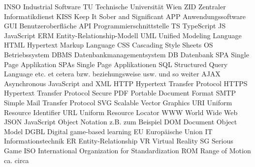 	{INSO}	{Industrial Software}
	{TU}	{Technische Universit\"at Wien}
	{ZID}	{Zentraler Informatikdienst}
	{KISS}	{Keep It Sober and Significant}
	{APP}	{Anwendungssoftware}
	{GUI}	{Benutzeroberfläche}
	{API}	{Programmierschnittstelle}
	{TS}	{TypeScript}
	{JS}	{JavaScript}
	{ERM}	{Entity-Relationship-Modell}
	{UML}	{Unified Modeling Language}
	{HTML}	{Hypertext Markup Language}
	{CSS}	{Cascading Style Sheets}
	{OS}	{Betriebssystem}
	{DBMS}	{Datenbankmanagementsystem}
	{DB}	{Datenbank}
	{SPA}	{Single Page Applikation}
	{SPAs}	{Single Page Applikationen}
	{SQL}	{Structured Query Language}
	{etc.}	{et cetera}
	{bzw.}	{beziehungsweise}
	{usw.}	{und so weiter}
	{AJAX}	{Asynchronous JavaScript and XML}
	{HTTP}	{Hypertext Transfer Protocol}
	{HTTPS}	{Hypertext Transfer Protocol Secure}
	{PDF}	{Portable Document Format}
	{SMTP}	{Simple Mail Transfer Protocol}
	{SVG}	{Scalable Vector Graphics}
	{URI}	{Uniform Resource Identifier}
	{URL}	{Uniform Resource Locator}
	{WWW}	{World Wide Web}
	{JSON}	{JavaScript Object Notation}
	{z.B.}	{zum Beispiel}
	{DOM}	{Document Object Model}
	{DGBL}	{Digital game-based learning}
	{EU}	{Europäische Union}
	{IT}	{Informationstechnik}
	{ER}	{Entity-Relationship}
	{VR}	{Virtual Reality}
	{SG}	{Serious Game}
	{ISO}	{International Organization for Standardization}
   {ROM}   {Range of Motion}
   {ca.}   {circa}


